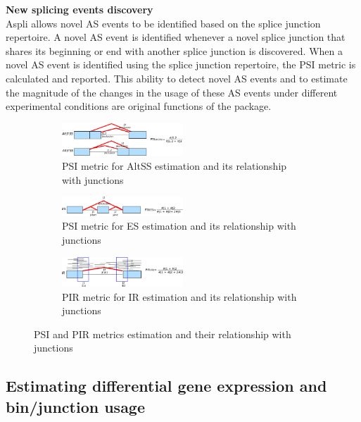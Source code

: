 \documentclass{article}
\begin{document}
\textbf{New splicing events discovery} \\
Aspli allows novel AS events to be identified based on the splice junction repertoire. A novel AS event is identified whenever a novel splice junction that shares its beginning or end with another splice junction is discovered. When a novel AS event is identified using the splice junction repertoire, the PSI metric is calculated and reported. This ability to detect novel AS events and to estimate the magnitude of the changes in the usage of these AS events under different experimental conditions are original functions of the package. 

\begin{figure}[ht!]
    \centering
    \begin{subfigure}[t]{1\textwidth}
    \centering
      \includegraphics[width=0.5\textwidth]{psi_altSS.png}
      \caption{PSI metric for AltSS estimation and its relationship with junctions}
    \end{subfigure}

\begin{subfigure}[t]{1\textwidth}
\centering
\includegraphics[width=0.5\textwidth]{psi_es.png}
\caption{PSI metric for ES estimation and its relationship with junctions}
\end{subfigure}

\begin{subfigure}[t]{1\textwidth}
\centering
\includegraphics[width=0.5\textwidth]{pir.png}
\caption{PIR metric for IR estimation and its relationship with junctions}
\end{subfigure}
\caption{PSI and PIR metrics estimation and their relationship with junctions}
\end{figure}

\subsection{Estimating differential gene expression and bin/junction usage}
\end{document}
